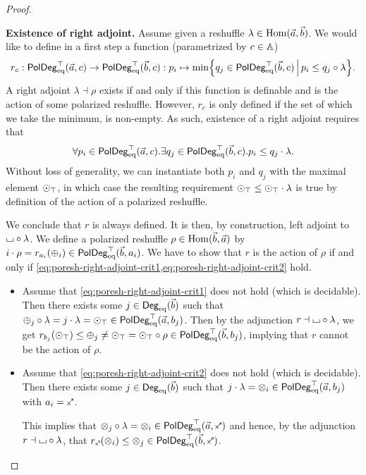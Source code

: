 \documentclass[a4paper]{memoir}
\begin{document}
\begin{proof}
\begin{enumerate}
		\textbf{Existence of right adjoint.}
		Assume given a reshuffle $\lambda \in {\mathrm{Hom}}(\vec a, \vec b)$.
		We would like to define in a first step a function (parametrized by $c \in {\mathbb{A}}$)
		\[
			r_c : \mathsf{PolDeg}_{\mathrm{eq}}^\top(\vec a, c) \to \mathsf{PolDeg}_{\mathrm{eq}}^\top(\vec b, c) : p_i \mapsto \min \mathopen{}\left\{ q_j \in \mathsf{PolDeg}_{\mathrm{eq}}^\top(\vec b, c) \,\middle|\, p_i \leq q_j \circ \lambda \right\}\mathclose{}.
		\]
		A right adjoint $\lambda \dashv \rho$ exists if and only if this function is definable and is the action of some polarized reshuffle.
		However, $r_c$ is only defined if the set of which we take the minimum, is non-empty.
		As such, existence of a right adjoint requires that
		\[
			\forall p_i \in \mathsf{PolDeg}_{\mathrm{eq}}^\top(\vec a, c) . \exists q_j \in \mathsf{PolDeg}_{\mathrm{eq}}^\top(\vec b, c). p_i \leq q_j \cdot \lambda.
		\]
		Without loss of generality, we can instantiate both $p_i$ and $q_j$ with the maximal element ${\odot}_\top$, in which case the resulting requirement ${\odot}_\top \leq {\odot}_\top \cdot \lambda$ is true by definition of the action of a polarized reshuffle.
		
		We conclude that $r$ is always defined.
		It is then, by construction, left adjoint to ${\llcorner\hspace{-.4ex}\lrcorner} \circ \lambda$.
		We define a polarized reshuffle $\rho \in {\mathrm{Hom}}(\vec b, \vec a)$ by $i \cdot \rho = r_{a_i}({\oplus}_i) \in \mathsf{PolDeg}_{\mathrm{eq}}^\top(\vec b, a_i)$.
		We have to show that $r$ is the action of $\rho$ if and only if \cref{eq:poresh-right-adjoint-crit1,eq:poresh-right-adjoint-crit2} hold.
		\begin{itemize}
			\item Assume that \cref{eq:poresh-right-adjoint-crit1} does not hold (which is decidable).
			Then there exists some $j \in {\mathsf{Deg}_{\mathrm{eq}}}(\vec b)$ such that ${\oplus}_j \circ \lambda = j \cdot \lambda = {\odot}_\top \in \mathsf{PolDeg}_{\mathrm{eq}}^\top(\vec a, b_j)$.
			Then by the adjunction $r \dashv {\llcorner\hspace{-.4ex}\lrcorner} \circ \lambda$, we get
			$r_{b_j}({\odot}_\top) \leq {\oplus}_j \neq {\odot}_\top = {\odot}_\top \circ \rho \in \mathsf{PolDeg}_{\mathrm{eq}}^\top(\vec b, b_j)$, implying that $r$ cannot be the action of $\rho$.
			
			\item Assume that \cref{eq:poresh-right-adjoint-crit2} does not hold (which is decidable).
			Then there exists some $j \in {\mathsf{Deg}_{\mathrm{eq}}}(\vec b)$ such that $j \cdot \lambda = {\otimes}_i \in \mathsf{PolDeg}_{\mathrm{eq}}^\top(\vec a, b_j)$ with $a_i = \ypolar$.
			
			This implies that $\mixpol_j \circ \lambda = \mixpol_i \in \poldegeqtop(\vec a, \ypolar)$ and hence, by the adjunction $r \dashv {\llcorner\hspace{-.4ex}\lrcorner} \circ \lambda$, that $r_\ypolar(\mixpol_i) \leq \mixpol_j \in \poldegeqtop(\vec b, \ypolar)$.
			

\end{itemize}
\end{enumerate}
\end{proof}
\end{document}
